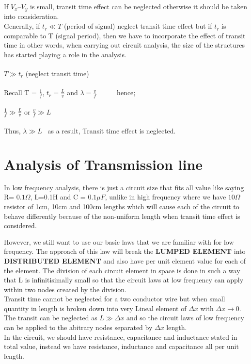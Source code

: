 	If $ V_{x} – V_{y} $ is small, transit time effect can be neglected otherwise it should be taken into consideration.
	\\
	
	Generally, if  $ t_{r} \ll T $ (period of signal) neglect transit time effect but if $ t_{r} $ is comparable to T (signal period), then we have to incorporate the effect of transit time in other words, when carrying out circuit analysis, the size of the structures has started playing a role in the analysis.\\
	\\
   $ T \gg t_{r} $ (neglect transit time) \\\\
   Recall T = $   \frac{1}{f}  $, $ t_{r} = \frac{L}{v} $ and $ \lambda = \frac{v}{f} $\ \ \ \ \ \ hence; 
\\\\
$ \frac{1}{f} \gg \frac{L}{v} $ or $ \frac{v}{f} \gg L $ \\\\
Thus, $ \lambda \gg L $ \ as a result, Transit time effect is neglected.

	\section{Analysis of Transmission line}
	In low frequency analysis, there is just a circuit size that fits all value like saying R= $ 0.1\Omega $, L=0.1H and C = $ 0.1\mu F $, unlike in high frequency where we have $ 10\Omega $ resistor of 1cm, 10cm and 100cm lengths which will cause each of the circuit to behave differently because of the non-uniform length when transit time effect is considered.
	
	However, we still want to use our basic laws that we are familiar with for low frequency. The approach of this law will break the\textbf{ LUMPED ELEMENT} into \textbf{DISTRIBUTED ELEMENT} and also have per unit element value for each of the element. The division of each circuit element in space is done in such a way that L is infinitisimally small so that the circuit laws at low frequency can apply within two nodes created by the division.\\
	
	Transit time cannot be neglected for a two conductor wire but when small quantity in length is broken down into very Lineal element of $ \Delta x $ with  $  \Delta x \rightarrow 0 $. The transit can be neglected as $ L \gg \Delta x $ and so the circuit laws of low frequency can be applied to the abitrary nodes separated by $ \Delta x $ length. \\
	In the circuit, we should have resistance, capacitance and inductance stated in total value, instead we have resistance, inductance and capacitance all per unit length.
	
